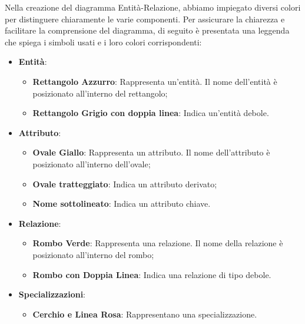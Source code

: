 Nella creazione del diagramma Entità-Relazione, abbiamo impiegato diversi colori per distinguere chiaramente le varie componenti. Per assicurare la chiarezza e facilitare la comprensione del diagramma, di seguito è presentata una leggenda che spiega i simboli usati e i loro colori corrispondenti:
\begin{itemize}[leftmargin=*,label={\textbullet},itemsep=0pt,topsep=0pt,partopsep=0pt]
    \item \textbf{Entità}:
          \begin{itemize}[leftmargin=*,label={\textbullet},itemsep=0pt,topsep=0pt,partopsep=0pt]
            \item \textbf{Rettangolo Azzurro}:  Rappresenta un'entità. Il nome dell'entità è posizionato all'interno del rettangolo;
            \item \textbf{Rettangolo Grigio con doppia linea}: Indica un'entità debole.
          \end{itemize}
    \item \textbf{Attributo}:
          \begin{itemize}[leftmargin=*,label={\textbullet},itemsep=0pt,topsep=0pt,partopsep=0pt]
            \item \textbf{Ovale Giallo}: Rappresenta un attributo. Il nome dell'attributo è posizionato all'interno dell'ovale;
            \item \textbf{Ovale tratteggiato}: Indica un attributo derivato;
            \item \textbf{Nome sottolineato}: Indica un attributo chiave.
          \end{itemize}
    \item \textbf{Relazione}:
          \begin{itemize}[leftmargin=*,label={\textbullet},itemsep=0pt,topsep=0pt,partopsep=0pt]
            \item \textbf{Rombo Verde}: Rappresenta una relazione. Il nome della relazione è posizionato all'interno del rombo;
            \item \textbf{Rombo con Doppia Linea}: Indica una relazione di tipo debole.
          \end{itemize}
    \item \textbf{Specializzazioni}:
          \begin{itemize}[leftmargin=*,label={\textbullet},itemsep=0pt,topsep=0pt,partopsep=0pt]
            \item \textbf{Cerchio e Linea Rosa}: Rappresentano una specializzazione.
                  \begin{itemize}[leftmargin=*,label={\textbullet},itemsep=0pt,topsep=0pt,partopsep=0pt]

\end{itemize}
\end{itemize}
\end{itemize}
